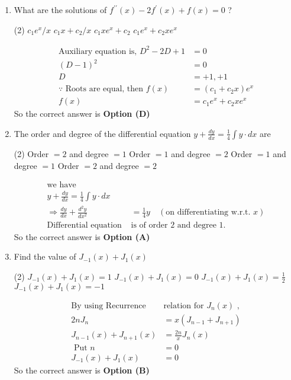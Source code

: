 \begin{enumerate}[label=\color{ocre}\textbf{\arabic*.}]
\item What are the solutions of $f^{\prime \prime}(x)-2 f^{\prime}(x)+f(x)=0$ ?
 \begin{tasks}(2)
	\task[\textbf{A.}]$c_{1} e^{x} / x$
	\task[\textbf{B.}]$c_{1} x+c_{2} / x$
	\task[\textbf{C.}] $c_{1} x e^{x}+c_{2}$
	\task[\textbf{D.}]  $c_{1} e^{x}+c_{2} x e^{x}$
\end{tasks}
\begin{answer}
	$$
	\begin{aligned}
	 \text{Auxiliary equation is, } D^{2}-2 D+1&=0 \\ (D-1)^{2}&=0 \\ D&=+1, +1\\
	\because\text{ Roots are equal, then }f(x)&=\left(c_{1}+c_{2} x\right) e^{x} \\ f(x)&=c_{1} e^{x}+c_{2} x e^{x}
	\end{aligned}
	$$
	So the correct answer is \textbf{Option (D)}
\end{answer}


\item The order and degree of the differential equation $y+\frac{d y}{d x}=\frac{1}{4} \int y \cdot d x$ are
 \begin{tasks}(2)
	\task[\textbf{a.}]Order $=2$ and degree $=1$
	\task[\textbf{b.}]Order $=1$ and degree $=2$
	\task[\textbf{c.}]Order $=1$ and degree $=1$
	\task[\textbf{d.}]Order $=2$ and degree $=2$ 
\end{tasks}
\begin{answer}
	$$
	\begin{aligned}
	\text{we have}\\
	y+\frac{d y}{d x}=\frac{1}{4} \int y \cdot d x \\
	\Rightarrow \frac{d y}{d x}+\frac{d^{2} y}{d x^{2}}&=\frac{1}{4} y\quad ( \text{on differentiating w.r.t. }x)\\
	\text{Differential equation }&\text{is of order 2 and degree 1.}
	\end{aligned}
	$$
	So the correct answer is \textbf{Option (A)}
\end{answer}


\item Find the value of $J_{-1}(x)+J_{1}(x)$
\begin{tasks}(2)
	\task[\textbf{a.}]$J_{-1}(x)+J_{1}(x)=1 $ 
	\task[\textbf{b.}]$J_{-1}(x)+J_{1}(x)=0 $ 
	\task[\textbf{c.}]$J_{-1}(x)+J_{1}(x)=\frac{1}{2} $  
	\task[\textbf{d.}]$J_{-1}(x)+J_{1}(x)=-1 $  
\end{tasks}
\begin{answer}
	$$
	\begin{aligned}
	\text{By using Recurrence }&\text{relation  for $J_{n}(x)$ ,}\\
		2 n J_{n}&=x \left(J_{n-1}+J_{n+1}\right) \\
		J_{n-1}(x)+J_{n+1}(x) &=\frac{2 n}{x} J_{n}(x) \\
		\text { Put } n &=0 \\
		J_{-1}(x)+J_{1}(x) &=0
	\end{aligned}
	$$
	So the correct answer is \textbf{Option (B)}
\end{answer}


\end{enumerate}
